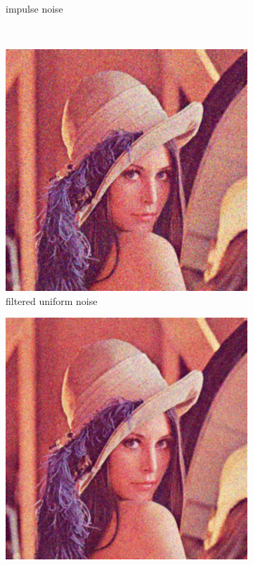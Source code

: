 \documentclass[12pt]{article}
\begin{document}
\begin{figure}[h]
\begin{subfigure}[t]{\subfiguresize}
        \caption{impulse noise}
    \end{subfigure}\\[2ex]
    \begin{subfigure}[t]{\subfiguresize}
        \includegraphics[width=\textwidth]{lenac_lowpass_uniform_1.png}
        \caption{filtered uniform noise}
    \end{subfigure}
    \begin{subfigure}[t]{\subfiguresize}
        \includegraphics[width=\textwidth]{lenac_lowpass_normal_1.png}

\end{subfigure}
\end{figure}
\end{document}
